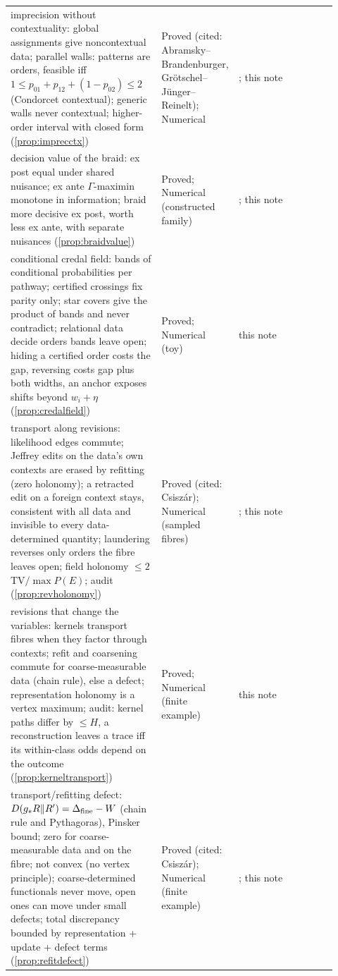 \documentclass[11pt]{article}
\theoremstyle{definition}\newtheorem{definition}[theorem]{Definition}\newtheorem{remark}[theorem]{Remark}\newtheorem{example}[theorem]{Example}\newtheorem{problem}[theorem]{Open problem}\crefname{problem}{Problem}{Problems}
\begin{document}
{\begin{longtable}{p{0.46\linewidth}p{0.16\linewidth}p{0.3\linewidth}}
\rowcolor{stNew} imprecision without contextuality: global assignments give noncontextual data; parallel walls: patterns are orders, feasible iff $1\le p_{01}+p_{12}+(1-p_{02})\le2$ (Condorcet contextual); generic walls never contextual; higher-order interval with closed form (\cref{prop:imprecctx}) & Proved (cited: Abramsky--Brandenburger, Gr\"otschel--J\"unger--Reinelt); Numerical & \cite{AbramskyBrandenburger2011,GrotschelJungerReinelt1985}; this note\\
\rowcolor{stNew} decision value of the braid: ex post equal under shared nuisance; ex ante $\Gamma$-maximin monotone in information; braid more decisive ex post, worth less ex ante, with separate nuisances (\cref{prop:braidvalue}) & Proved; Numerical (constructed family) & \cite{SeidenfeldWasserman1993}; this note\\
\rowcolor{stNew} conditional credal field: bands of conditional probabilities per pathway; certified crossings fix parity only; star covers give the product of bands and never contradict; relational data decide orders bands leave open; hiding a certified order costs the gap, reversing costs gap plus both widths, an anchor exposes shifts beyond $w_i+\eta$ (\cref{prop:credalfield}) & Proved; Numerical (toy) & this note\\
\rowcolor{stNew} transport along revisions: likelihood edges commute; Jeffrey edits on the data's own contexts are erased by refitting (zero holonomy); a retracted edit on a foreign context stays, consistent with all data and invisible to every data-determined quantity; laundering reverses only orders the fibre leaves open; field holonomy $\le2\,$TV$/\max P(E)$; audit (\cref{prop:revholonomy}) & Proved (cited: Csisz\'ar); Numerical (sampled fibres) & \cite{Csiszar1975}; this note\\
\rowcolor{stNew} revisions that change the variables: kernels transport fibres when they factor through contexts; refit and coarsening commute for coarse-measurable data (chain rule), else a defect; representation holonomy is a vertex maximum; audit: kernel paths differ by $\le H$, a reconstruction leaves a trace iff its within-class odds depend on the outcome (\cref{prop:kerneltransport}) & Proved; Numerical (finite example) & this note\\
\rowcolor{stNew} transport/refitting defect: $D(g_*R\Vert R')=\Delta_{\rm fine}-W$ (chain rule and Pythagoras), Pinsker bound; zero for coarse-measurable data and on the fibre; not convex (no vertex principle); coarse-determined functionals never move, open ones can move under small defects; total discrepancy bounded by representation + update + defect terms (\cref{prop:refitdefect}) & Proved (cited: Csisz\'ar); Numerical (finite example) & \cite{Csiszar1975}; this note\\

\end{longtable}}
\end{document}
